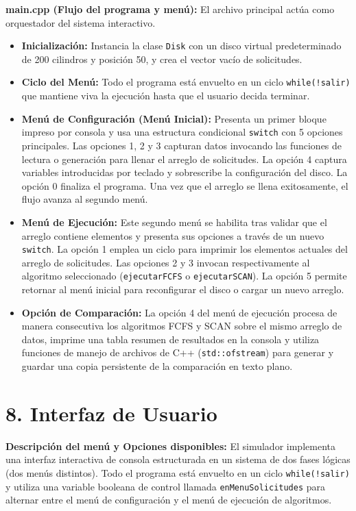 \documentclass[14pt,letterpaper]{extarticle}
\begin{document}
\textbf{main.cpp (Flujo del programa y menú):} El archivo principal actúa como orquestador del sistema interactivo.

\begin{itemize}
    \item \textbf{Inicialización:} Instancia la clase \texttt{Disk} con un disco virtual predeterminado de 200 cilindros y posición 50, y crea el vector vacío de solicitudes.
    \item \textbf{Ciclo del Menú:} Todo el programa está envuelto en un ciclo \texttt{while(!salir)} que mantiene viva la ejecución hasta que el usuario decida terminar.
    \item \textbf{Menú de Configuración (Menú Inicial):} Presenta un primer bloque impreso por consola y usa una estructura condicional \texttt{switch} con 5 opciones principales. Las opciones 1, 2 y 3 capturan datos invocando las funciones de lectura o generación para llenar el arreglo de solicitudes. La opción 4 captura variables introducidas por teclado y sobrescribe la configuración del disco. La opción 0 finaliza el programa. Una vez que el arreglo se llena exitosamente, el flujo avanza al segundo menú.
    \item \textbf{Menú de Ejecución:} Este segundo menú se habilita tras validar que el arreglo contiene elementos y presenta sus opciones a través de un nuevo \texttt{switch}. La opción 1 emplea un ciclo para imprimir los elementos actuales del arreglo de solicitudes. Las opciones 2 y 3 invocan respectivamente al algoritmo seleccionado (\texttt{ejecutarFCFS} o \texttt{ejecutarSCAN}). La opción 5 permite retornar al menú inicial para reconfigurar el disco o cargar un nuevo arreglo.
    \item \textbf{Opción de Comparación:} La opción 4 del menú de ejecución procesa de manera consecutiva los algoritmos FCFS y SCAN sobre el mismo arreglo de datos, imprime una tabla resumen de resultados en la consola y utiliza funciones de manejo de archivos de C++ (\texttt{std::ofstream}) para generar y guardar una copia persistente de la comparación en texto plano.
\end{itemize}

\vfill

\section*{8. Interfaz de Usuario}

\textbf{Descripción del menú y Opciones disponibles:} El simulador implementa una interfaz interactiva de consola estructurada en un sistema de dos fases lógicas (dos menús distintos). Todo el programa está envuelto en un ciclo \texttt{while(!salir)} y utiliza una variable booleana de control llamada \texttt{enMenuSolicitudes} para alternar entre el menú de configuración y el menú de ejecución de algoritmos.
\end{document}

